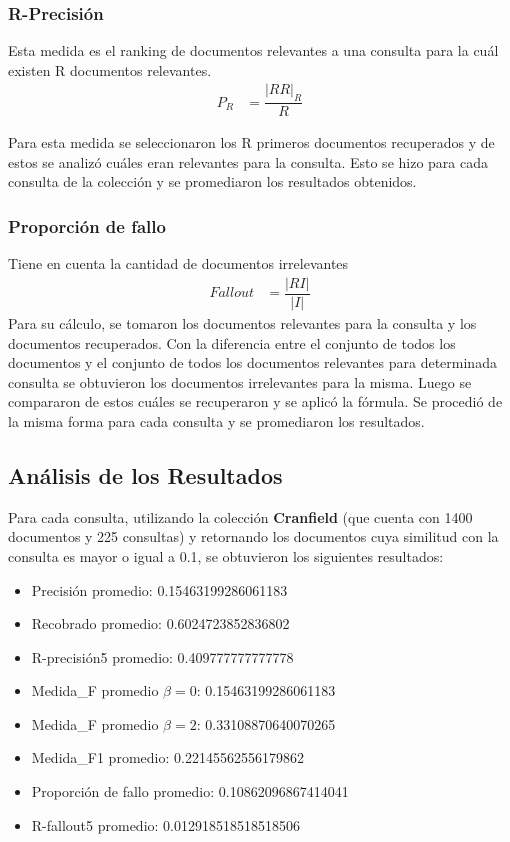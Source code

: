 \documentclass[runningheads]{llncs}
\begin{document}
\subsubsection{R-Precisi\'on}

Esta medida es el ranking de documentos relevantes a una consulta para la cuál existen R documentos relevantes.
	\begin{align*}
	P_{R}&=\dfrac{|RR|_{R}}{R}
	\end{align*}
	
	Para esta medida se seleccionaron los R primeros documentos recuperados y de estos se analiz\'o cu\'ales eran relevantes para la consulta. Esto se hizo para cada consulta de la colecci\'on y se promediaron los resultados obtenidos.

\subsubsection{Proporci\'on de fallo}
Tiene en cuenta la cantidad de documentos irrelevantes 
	\begin{align*}
	Fallout&=\dfrac{|RI|}{|I|}
	\end{align*}
	Para su c\'alculo, se tomaron los documentos relevantes para la consulta y los documentos recuperados. Con la diferencia entre el conjunto de todos los documentos y el conjunto de todos los documentos relevantes para determinada consulta se obtuvieron los documentos irrelevantes para la misma. Luego se compararon de estos cu\'ales se recuperaron y se aplic\'o la f\'ormula. Se procedi\'o de la misma forma para cada consulta y se promediaron los resultados.
	
\subsection{An\'alisis de los Resultados}
Para cada consulta, utilizando la colecci\'on \textbf{Cranfield} (que cuenta con 1400 documentos y 225 consultas) y retornando los documentos cuya similitud con la consulta es mayor o igual a 0.1, se obtuvieron los siguientes resultados:

\begin{itemize}
\item Precisi\'on promedio:  0.15463199286061183
\item Recobrado promedio:  0.6024723852836802
\item R-precisi\'on5 promedio:  0.409777777777778
\item Medida\_F promedio  $ \beta=0 $:  0.15463199286061183 
\item Medida\_F promedio  $ \beta=2 $:  0.33108870640070265
\item Medida\_F1 promedio: 0.22145562556179862
\item Proporci\'on de fallo  promedio:  0.10862096867414041
\item R-fallout5 promedio:  0.012918518518518506
\end{itemize}
\end{document}
